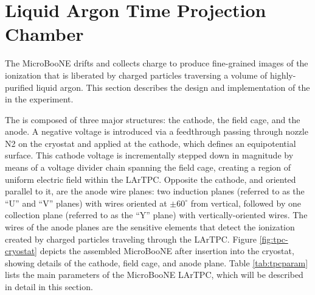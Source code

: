 \section{Liquid Argon Time Projection Chamber}
\label{sec:tpc-all}

The MicroBooNE \lartpc drifts and collects charge to produce fine-grained images of the ionization that is liberated by charged particles traversing a volume of highly-purified liquid argon.  This section describes the design and implementation of the \lartpc in the experiment.

The \lartpc is composed of three major structures: the cathode, the field cage, and the anode. A negative voltage is introduced via a feedthrough passing through nozzle N2 on the cryostat and applied at the cathode, which defines an equipotential surface.  This cathode voltage is incrementally stepped down in magnitude by means of a voltage divider chain spanning the field cage, creating a region of uniform electric field within the LArTPC. Opposite the cathode, and oriented parallel to it, are the anode wire planes: two induction planes (referred to as the ``U'' and ``V'' planes) with wires oriented at $\pm60^{\circ}$ from vertical, followed by one collection plane (referred to as the ``Y'' plane) with vertically-oriented wires.   The wires of the anode planes are the sensitive elements that detect the ionization created by charged particles traveling through the LArTPC.  Figure \ref{fig:tpc-cryostat} depicts the assembled MicroBooNE \lartpc after insertion into the cryostat, showing details of the cathode, field cage, and anode plane.  Table \ref{tab:tpcparam} lists the main parameters of the MicroBooNE LArTPC, which will be described in detail in this section.  


